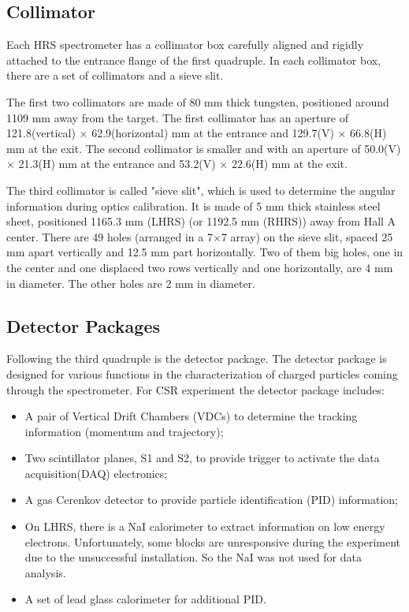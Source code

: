 \subsection{Collimator}
Each HRS spectrometer has a collimator box carefully aligned and rigidly attached to the entrance flange of the 
first quadruple.
In each collimator box, there are a set of collimators and a sieve slit.

The first two collimators are made of 80 mm thick tungsten, positioned around 1109 mm away from the target.
The first collimator has an aperture of 121.8(vertical) $\times$ 62.9(horizontal) mm at the entrance and
129.7(V) $\times$ 66.8(H) mm at the exit.
The second collimator is smaller and with an aperture of 50.0(V) $\times$ 21.3(H) mm at the entrance and 53.2(V) $\times$
22.6(H) mm at the exit.

The third collimator is called "sieve slit", which is used to determine the angular information during optics calibration.
It is made of 5 mm thick stainless steel sheet, positioned 1165.3 mm (LHRS) (or 1192.5 mm (RHRS)) away from Hall A center.
There are 49 holes (arranged in a 7$\times$7 array) on the sieve slit, spaced 25 mm apart vertically and 12.5 mm part horizontally.
Two of them big holes, one in the center and one displaced two rows vertically and one horizontally, are 4 mm in
diameter. The other holes are 2 mm in diameter.

\subsection{Detector Packages}
Following the third quadruple is the detector package.
The detector package is designed for various functions in the characterization of charged particles coming through the spectrometer.
For CSR experiment the detector package includes:

\begin{itemize}
\item A pair of Vertical Drift Chambers (VDCs) to determine the tracking information (momentum and trajectory);
\item Two scintillator planes, S1 and S2, to provide trigger to activate the data acquisition(DAQ) electronics;
\item A gas Cerenkov detector to provide particle identification (PID) information;
\item On LHRS, there is a NaI calorimeter to extract information on low energy electrons. 
Unfortunately, some blocks are unresponsive during the experiment due to the unsuccessful installation.
So the NaI was not used for data analysis.
\item A set of lead glass calorimeter for additional PID.
\end{itemize}

